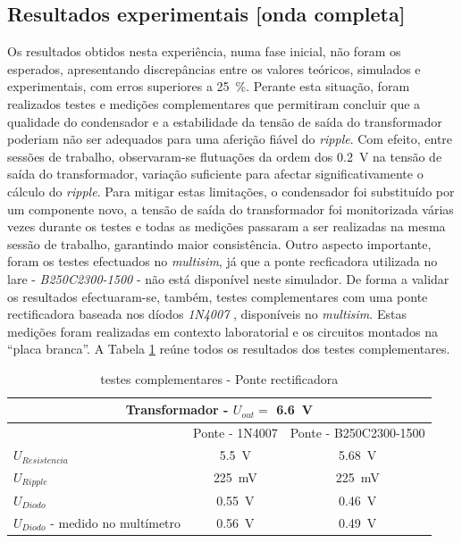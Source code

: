 \subsection{Resultados experimentais [onda completa]}
\label{sec:resultados_RectificadoresOndacompleta}
Os resultados obtidos nesta experiência, numa fase inicial, não foram os esperados, apresentando discrepâncias entre os valores teóricos, simulados e experimentais, com erros superiores a \SI{25}{\percent}. Perante esta situação, foram realizados testes e medições complementares que permitiram concluir que a qualidade do condensador e a estabilidade da tensão de saída do transformador poderiam não ser adequados para uma aferição fiável do \textit{ripple}. Com efeito, entre sessões de trabalho, observaram-se flutuações da ordem dos \SI{0.2}{\volt} na tensão de saída do transformador, variação suficiente para afectar significativamente o cálculo do \textit{ripple}. Para mitigar estas limitações, o condensador foi substituído por um componente novo, a tensão de saída do transformador foi monitorizada várias vezes durante os testes e todas as medições passaram a ser realizadas na mesma sessão de trabalho, garantindo maior consistência.
Outro aspecto importante, foram os testes efectuados no \textit{multisim}, já que a ponte recficadora utilizada no \acrshort{lare} - \textit{B250C2300-1500} \cite{B250C2306} - não está disponível neste simulador. De forma a validar os resultados efectuaram-se, também, testes complementares com uma ponte rectificadora baseada nos díodos \textit{1N4007} \cite{1N400x}, disponíveis no \textit{multisim}. Estas medições foram realizadas em contexto laboratorial e os circuitos montados na ``placa branca''.
A Tabela \ref{Table:testespontes} reúne todos os resultados dos testes complementares.

\begin{table}[htb]
\centering
\caption{testes complementares - Ponte rectificadora} 
\label{Table:testespontes}
\begin{tabular}{lcc}
\toprule
\multicolumn{3}{c}{Transformador - $U_{out} = $ \SI{6.6}{\volt}} \\
\midrule
 & Ponte - 1N4007 & Ponte - B250C2300-1500 \\
\midrule
$U_{Resistencia}$ & \SI{5.5}{\volt} & \SI{5.68}{\volt} \\
\midrule
$U_{Ripple}$ & \SI{225}{\milli\volt} & \SI{225}{\milli\volt} \\
\midrule
$U_{Diodo}$ & \SI{0.55}{\volt} & \SI{0.46}{\volt} \\
\midrule
$U_{Diodo}$ - medido no multímetro & \SI{0.56}{\volt} & \SI{0.49}{\volt} \\
\bottomrule
\end{tabular}
\end{table}

